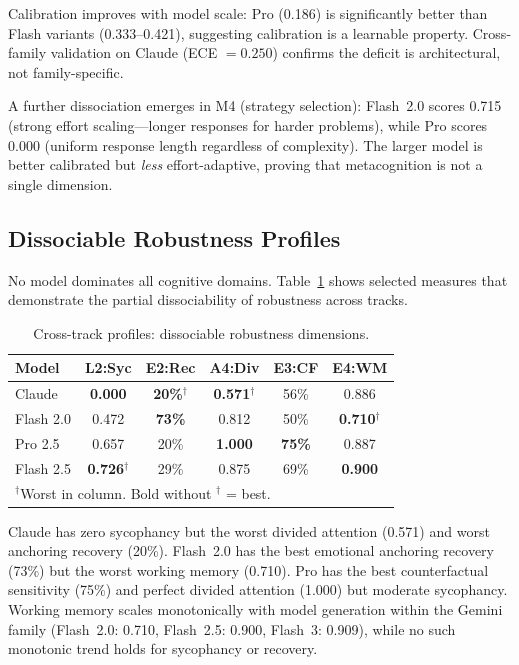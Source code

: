 \documentclass[conference]{IEEEtran}
\begin{document}
Calibration improves with model scale: Pro (0.186) is significantly better than Flash variants (0.333--0.421), suggesting calibration is a learnable property. Cross-family validation on Claude (ECE $= 0.250$) confirms the deficit is architectural, not family-specific.

A further dissociation emerges in M4 (strategy selection): Flash~2.0 scores 0.715 (strong effort scaling---longer responses for harder problems), while Pro scores 0.000 (uniform response length regardless of complexity). The larger model is better calibrated but \emph{less} effort-adaptive, proving that metacognition is not a single dimension.

\subsection{Dissociable Robustness Profiles}

No model dominates all cognitive domains. Table~\ref{tab:profiles} shows selected measures that demonstrate the partial dissociability of robustness across tracks.

\begin{table}[htbp]
\caption{Cross-track profiles: dissociable robustness dimensions.}
\label{tab:profiles}
\centering
\footnotesize
\begin{tabular}{@{}lccccc@{}}
\toprule
\textbf{Model} & \textbf{L2:Syc} & \textbf{E2:Rec} & \textbf{A4:Div} & \textbf{E3:CF} & \textbf{E4:WM} \\
\midrule
Claude & \textbf{0.000} & \textbf{20\%}$^\dagger$ & \textbf{0.571}$^\dagger$ & 56\% & 0.886 \\
Flash 2.0 & 0.472 & \textbf{73\%} & 0.812 & 50\% & \textbf{0.710}$^\dagger$ \\
Pro 2.5 & 0.657 & 20\% & \textbf{1.000} & \textbf{75\%} & 0.887 \\
Flash 2.5 & \textbf{0.726}$^\dagger$ & 29\% & 0.875 & 69\% & \textbf{0.900} \\
\bottomrule
\multicolumn{6}{l}{\footnotesize $^\dagger$Worst in column. Bold without $^\dagger$ = best.}
\end{tabular}
\end{table}

Claude has zero sycophancy but the worst divided attention (0.571) and worst anchoring recovery (20\%). Flash~2.0 has the best emotional anchoring recovery (73\%) but the worst working memory (0.710). Pro has the best counterfactual sensitivity (75\%) and perfect divided attention (1.000) but moderate sycophancy. Working memory scales monotonically with model generation within the Gemini family (Flash~2.0: 0.710, Flash~2.5: 0.900, Flash~3: 0.909), while no such monotonic trend holds for sycophancy or recovery.
\end{document}

